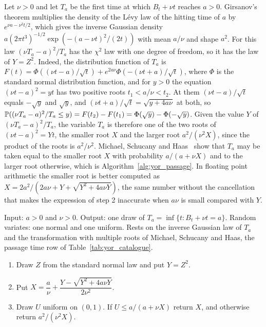 Let $\nu>0$ and let $T_a$ be the first time at which $B_t+\nu t$ reaches $a>0$. Girsanov's theorem multiplies the density of the L\'evy law of the hitting time of $a$ by $e^{\nu a-\nu^2t/2}$, which gives the inverse Gaussian density $a(2\pi t^3)^{-1/2}\exp(-(a-\nu t)^2/(2t))$ with mean $a/\nu$ and shape $a^2$. For this law $(\nu T_a-a)^2/T_a$ has the $\chi^2$ law with one degree of freedom, so it has the law of $Y=Z^2$. Indeed, the distribution function of $T_a$ is $F(t)=\Phi((\nu t-a)/\sqrt t)+e^{2a\nu}\Phi(-(\nu t+a)/\sqrt t)$, where $\Phi$ is the standard normal distribution function, and for $y>0$ the equation $(\nu t-a)^2=yt$ has two positive roots $t_1<a/\nu<t_2$. At them $(\nu t-a)/\sqrt t$ equals $-\sqrt y$ and $\sqrt y$, and $(\nu t+a)/\sqrt t=\sqrt{y+4a\nu}$ at both, so $\P((\nu T_a-a)^2/T_a\le y)=F(t_2)-F(t_1)=\Phi(\sqrt y)-\Phi(-\sqrt y)$. Given the value $Y$ of $(\nu T_a-a)^2/T_a$, the variable $T_a$ is therefore one of the two roots of $(\nu t-a)^2=Yt$, the smaller root $X$ and the larger root $a^2/(\nu^2X)$, since the product of the roots is $a^2/\nu^2$. Michael, Schucany and Haas~\cite{michael1976} show that $T_a$ may be taken equal to the smaller root $X$ with probability $a/(a+\nu X)$ and to the larger root otherwise, which is Algorithm~\ref{alg:yor_passage}. In floating point arithmetic the smaller root is better computed as $X=2a^2/(2a\nu+Y+\sqrt{Y^2+4a\nu Y})$, the same number without the cancellation that makes the expression of step 2 inaccurate when $a\nu$ is small compared with $Y$.

\begin{samepage}
\begin{algorithm}\label{alg:yor_passage}
Input: $a>0$ and $\nu>0$. Output: one draw of $T_a=\inf\{t:B_t+\nu t=a\}$. Random variates: one normal and one uniform. Rests on the inverse Gaussian law of $T_a$ and the transformation with multiple roots of Michael, Schucany and Haas, the passage time row of Table~\ref{tab:yor_catalogue}.
\begin{enumerate}[nosep]
\item Draw $Z$ from the standard normal law and put $Y=Z^2$.
\item Put $X=\dfrac{a}{\nu}+\dfrac{Y-\sqrt{Y^2+4a\nu Y}}{2\nu^2}$.
\item Draw $U$ uniform on $(0,1)$. If $U\le a/(a+\nu X)$ return $X$, and otherwise return $a^2/(\nu^2X)$.
\end{enumerate}
\end{algorithm}
\end{samepage}

